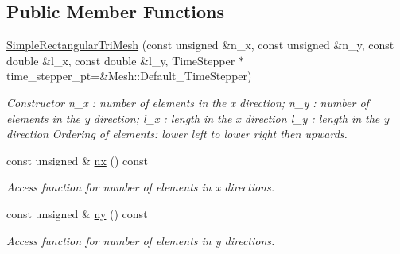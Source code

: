 \subsection*{Public Member Functions}
\begin{DoxyCompactItemize}
\item 
\hyperlink{classoomph_1_1SimpleRectangularTriMesh_a4a4e728bd6245b820d4698de28ee7d38}{Simple\+Rectangular\+Tri\+Mesh} (const unsigned \&n\+\_\+x, const unsigned \&n\+\_\+y, const double \&l\+\_\+x, const double \&l\+\_\+y, Time\+Stepper $\ast$time\+\_\+stepper\+\_\+pt=\&Mesh\+::\+Default\+\_\+\+Time\+Stepper)
\begin{DoxyCompactList}\small\item\em Constructor n\+\_\+x \+: number of elements in the x direction; n\+\_\+y \+: number of elements in the y direction; l\+\_\+x \+: length in the x direction l\+\_\+y \+: length in the y direction Ordering of elements\+: \textquotesingle{}lower left\textquotesingle{} to \textquotesingle{}lower right\textquotesingle{} then \textquotesingle{}upwards\textquotesingle{}. \end{DoxyCompactList}\item 
const unsigned \& \hyperlink{classoomph_1_1SimpleRectangularTriMesh_ac8fcc898b00209b300684dd8addd9b4f}{nx} () const
\begin{DoxyCompactList}\small\item\em Access function for number of elements in x directions. \end{DoxyCompactList}\item 
const unsigned \& \hyperlink{classoomph_1_1SimpleRectangularTriMesh_a39f3713497e6c9fef258d5f239ad5d3b}{ny} () const
\begin{DoxyCompactList}\small\item\em Access function for number of elements in y directions. \end{DoxyCompactList}\end{DoxyCompactItemize}

